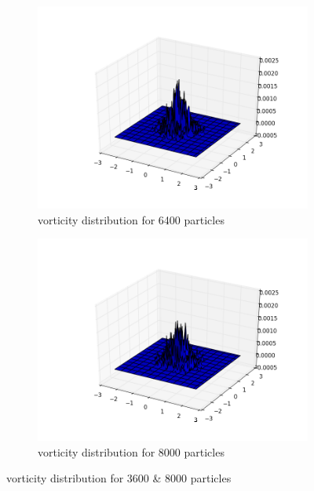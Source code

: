 \documentclass[a4paper,11pt]{article}
\begin{document}
\begin{figure}[h]
	\centering
	\begin{subfigure}[h]{.5\textwidth}
  		\centering
  		\includegraphics[width=.8\linewidth]{vorticity_distribution_for_6400_particles.png}
  		\caption{vorticity distribution for 6400 particles}
  		\label{fig:64}
	\end{subfigure}
	\begin{subfigure}[h]{.5\textwidth}
  		\centering
  		\includegraphics[width=.8\linewidth]{vorticity_distribution_for_8000_particles.png}
  		\caption{vorticity distribution for 8000 particles}
  		\label{fig:80}
	\end{subfigure}
	\label{fig:Question 1a}
  \caption{vorticity distribution for 3600 \& 8000 particles}
\end{figure}
\end{document}
